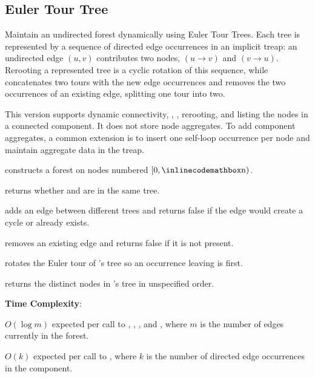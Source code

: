 \subsection{Euler Tour Tree}
\label{sec:2.8.9}
Maintain an undirected forest dynamically using Euler Tour Trees. Each tree is represented by a sequence of directed edge occurrences in an implicit treap: an undirected edge $(u, v)$ contributes two nodes, $(u \to v)$ and $(v \to u)$. Rerooting a represented tree is a cyclic rotation of this sequence, while  concatenates two tours with the new edge occurrences and  removes the two occurrences of an existing edge, splitting one tour into two.

This version supports dynamic connectivity, , , rerooting, and listing the nodes in a connected component. It does not store node aggregates. To add component aggregates, a common extension is to insert one self-loop occurrence per node and maintain aggregate data in the treap.

\begin{compactitem}
  \item {} constructs a forest on nodes numbered $[0, {\inlinecodemath{n}})$.
  \item {} returns whether  and  are in the same tree.
  \item {} adds an edge between different trees and returns false if the edge would create a cycle or already exists.
  \item {} removes an existing edge and returns false if it is not present.
  \item {} rotates the Euler tour of 's tree so an occurrence leaving  is first.
  \item {} returns the distinct nodes in 's tree in unspecified order.
\end{compactitem}

\textbf{Time Complexity}:
\begin{compactitem}
  \item $O(\log m)$ expected per call to , , , and , where $m$ is the number of edges currently in the forest.
  \item $O(k)$ expected per call to , where $k$ is the number of directed edge occurrences in the component.
\end{compactitem}

